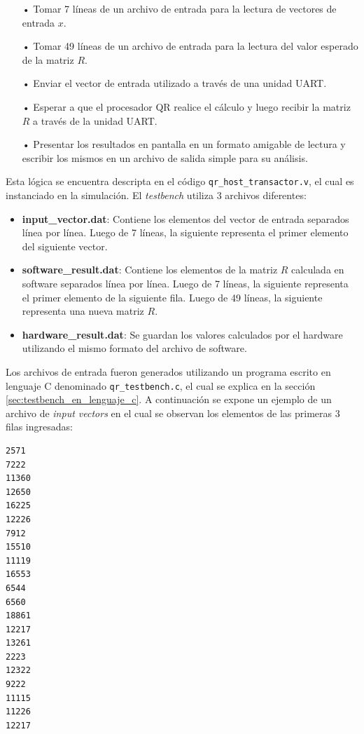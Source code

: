 \begin{enumerate}
   \item[•] Tomar 7 líneas de un archivo de entrada para la lectura de vectores de entrada $x$.
   \item[•] Tomar 49 líneas de un archivo de entrada para la lectura del valor esperado de la matriz $R$.
   \item[•] Enviar el vector de entrada utilizado a través de una unidad UART.
   \item[•] Esperar a que el procesador QR realice el cálculo y luego recibir la matriz $R$ a través de la unidad UART.
   \item[•] Presentar los resultados en pantalla en un formato amigable de lectura y escribir los mismos en un archivo de salida simple para su análisis.
\end{enumerate}

Esta lógica se encuentra descripta en el código \verb;qr_host_transactor.v;, el cual es instanciado en la simulación. El \textit{testbench} utiliza 3 archivos diferentes:

\begin{itemize}
   \item \textbf{input\_vector.dat}: Contiene los elementos del vector de entrada separados línea por línea. Luego de 7 líneas, la siguiente representa el primer elemento del siguiente vector.
   \item \textbf{software\_result.dat}: Contiene los elementos de la matriz $R$ calculada en software separados línea por línea. Luego de 7 líneas, la siguiente representa el primer elemento de la siguiente fila. Luego de 49 líneas, la siguiente representa una nueva matriz $R$.
   \item \textbf{hardware\_result.dat}: Se guardan los valores calculados por el hardware utilizando el mismo formato del archivo de software.
\end{itemize}

Los archivos de entrada fueron generados utilizando un programa escrito en lenguaje C denominado \verb;qr_testbench.c;, el cual se explica en la sección \ref{sec:testbench_en_lenguaje_c}. A continuación se expone un ejemplo de un archivo de \textit{input vectors} en el cual se observan los elementos de las primeras 3 filas ingresadas:

\begin{lstlisting}[style=C]
2571
7222
11360
12650
16225
12226
7912
15510
11119
16553
6544
6560
18861
12217
13261
2223
12322
9222
11115
11226
12217
\end{lstlisting}

